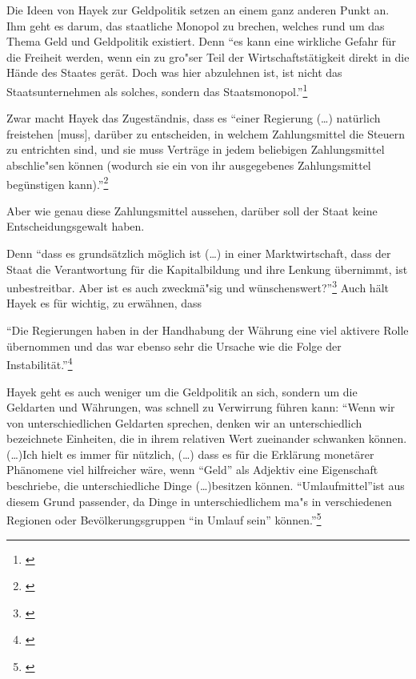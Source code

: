 \documentclass[
        onecolumn,
        a4paper,
        abstracton,
        parskip=half
        ,final
        ]{scrartcl}
\begin{document}
Die Ideen von Hayek zur Geldpolitik setzen an einem ganz anderen Punkt an. Ihm geht es darum, das staatliche Monopol zu brechen, welches rund um das Thema Geld und Geldpolitik existiert. Denn
"`es kann eine wirkliche Gefahr f{\"u}r die Freiheit werden, wenn ein zu gro{"s}er Teil der Wirtschaftst{\"a}tigkeit direkt in die H{\"a}nde des Staates ger{\"a}t. Doch was hier abzulehnen ist, ist nicht das Staatsunternehmen als solches, sondern das Staatsmonopol."'\footnote[411]{\citep*[S.290]{hayek1971}}

Zwar macht Hayek das Zugest{\"a}ndnis, dass es "`einer Regierung (\ldots) nat{\"u}rlich freistehen [muss], dar{\"u}ber zu entscheiden, in welchem Zahlungsmittel die Steuern zu entrichten sind, und sie muss Vertr{\"a}ge in jedem beliebigen Zahlungsmittel abschlie{"s}en k{\"o}nnen (wodurch sie ein von ihr ausgegebenes Zahlungsmittel beg{\"u}nstigen kann)."'\footnote[412]{\citep*[S.23]{Hayek1977}}

Aber wie genau diese Zahlungsmittel aussehen, dar{\"u}ber soll der Staat keine Entscheidungsgewalt haben.

Denn "`dass es grunds{\"a}tzlich m{\"o}glich ist (\ldots) in einer Marktwirtschaft, dass der Staat die Verantwortung f{\"u}r die Kapitalbildung und ihre Lenkung {\"u}bernimmt, ist unbestreitbar. Aber ist es auch zweckm{\"a}{"s}ig und w{\"u}nschenswert?"'\footnote[413]{\citep*[S.22]{Hayek1969}}
Auch h{\"a}lt Hayek es f{\"u}r wichtig, zu erw{\"a}hnen, dass

"`Die Regierungen haben in der Handhabung der W{\"a}hrung eine viel aktivere Rolle {\"u}bernommen und das war ebenso sehr die Ursache wie die Folge der Instabilit{\"a}t."'\footnote[415]{ \citep*[S.409]{hayek1971}}

Hayek geht es auch weniger um die Geldpolitik an sich, sondern um die Geldarten und W{\"a}hrungen, was schnell zu Verwirrung f{\"u}hren kann: "`Wenn wir von unterschiedlichen Geldarten sprechen, denken wir an unterschiedlich bezeichnete Einheiten, die in ihrem relativen Wert zueinander schwanken k{\"o}nnen. (\ldots)Ich hielt es immer f{\"u}r n{\"u}tzlich, (\ldots) dass es f{\"u}r die Erkl{\"a}rung monet{\"a}rer Ph{\"a}nomene viel hilfreicher w{\"a}re, wenn "`Geld"' als Adjektiv eine Eigenschaft beschriebe, die unterschiedliche Dinge (\ldots)besitzen k{\"o}nnen. "`Umlaufmittel"'ist aus diesem Grund passender, da Dinge in unterschiedlichem ma{"s} in verschiedenen Regionen oder Bev{\"o}lkerungsgruppen "`in Umlauf sein"' k{\"o}nnen."'\footnote[416]{\citep*[S.40f]{Hayek1977}}
\end{document}
